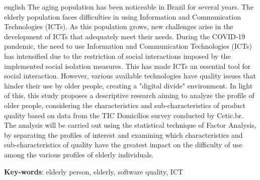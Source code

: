 \begin{resumo}[Abstract]
 \begin{otherlanguage*}{english}
The aging population has been noticeable in Brazil for several years. The elderly population faces difficulties in using Information and Communication Technologies (ICTs). As this population grows, new challenges arise in the development of ICTs that adequately meet their needs. During the COVID-19 pandemic, the need to use Information and Communication Technologies (ICTs) has intensified due to the restriction of social interactions imposed by the implemented social isolation measures. This has made ICTs an essential tool for social interaction. However, various available technologies have quality issues that hinder their use by older people, creating a "digital divide" environment. In light of this, this study proposes a descriptive research aiming to analyze the profile of older people, considering the characteristics and sub-characteristics of product quality based on data from the TIC Domicílios survey conducted by Cetic.br. The analysis will be carried out using the statistical technique of Factor Analysis, by separating the profiles of interest and examining which characteristics and sub-characteristics of quality have the greatest impact on the difficulty of use among the various profiles of elderly individuals.

   \vspace{\onelineskip}
 
   \noindent 
   \textbf{Key-words}: elderly person, elderly, software quality, ICT
 \end{otherlanguage*}
\end{resumo}
